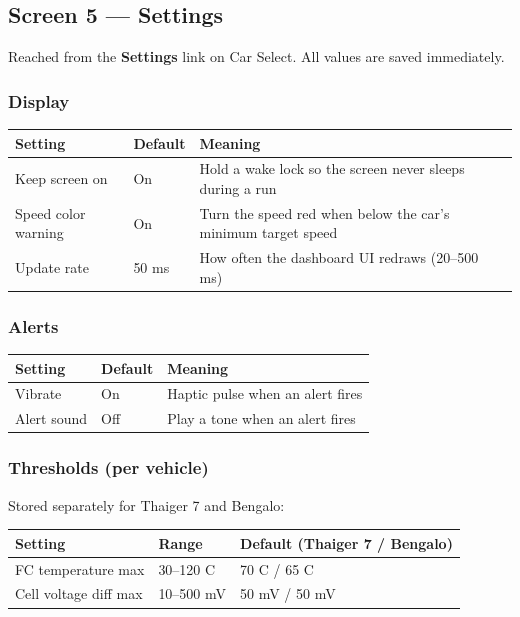 \documentclass[11pt,a4paper,oneside]{report}
\newcommand{\degC}{\textdegree C}
\begin{document}
\subsection{Screen 5 --- Settings}
Reached from the \textbf{Settings} link on Car Select. All values are saved
immediately.

\subsubsection{Display}

\begin{tabularx}{\linewidth}{@{}llL@{}}
\toprule
\textbf{Setting} & \textbf{Default} & \textbf{Meaning}\\
\midrule
Keep screen on & On & Hold a wake lock so the screen never sleeps during a run\\
Speed color warning & On & Turn the speed red when below the car's minimum target speed\\
Update rate & 50 ms & How often the dashboard UI redraws (20--500 ms)\\
\bottomrule
\end{tabularx}

\subsubsection{Alerts}

\begin{tabularx}{\linewidth}{@{}llL@{}}
\toprule
\textbf{Setting} & \textbf{Default} & \textbf{Meaning}\\
\midrule
Vibrate & On & Haptic pulse when an alert fires\\
Alert sound & Off & Play a tone when an alert fires\\
\bottomrule
\end{tabularx}

\subsubsection{Thresholds (per vehicle)}
Stored separately for Thaiger 7 and Bengalo:

\begin{tabularx}{\linewidth}{@{}llL@{}}
\toprule
\textbf{Setting} & \textbf{Range} & \textbf{Default (Thaiger 7 / Bengalo)}\\
\midrule
FC temperature max & 30--120 \degC{} & 70 \degC{} / 65 \degC{}\\
Cell voltage diff max & 10--500 mV & 50 mV / 50 mV\\
\bottomrule
\end{tabularx}
\end{document}
